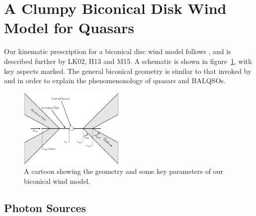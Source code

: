 \documentclass[preprint, a4paper, 11pt]{aastex}
\begin{document}




\section{A Clumpy Biconical Disk Wind Model for Quasars}

Our kinematic prescription for a biconical disc wind model
follows \cite{SV93}, and is described further by
LK02, H13 and M15. A schematic is shown in figure~\ref{fig:cartoon},
with key aspects marked. The general biconical
geometry is similar to that invoked by \cite{MCGV95} and 
\cite{elvis2000} in order to explain the phenomenonology
of quasars and BALQSOs.


\begin{figure} 
\centering
\includegraphics[width=0.45\textwidth]{figures/fig2_cartoon.eps}
\caption
{
A cartoon showing the geometry and some key parameters of
our biconical wind model.
}
\label{fig:cartoon}
\end{figure} 





\subsection{Photon Sources}

\end{document}

